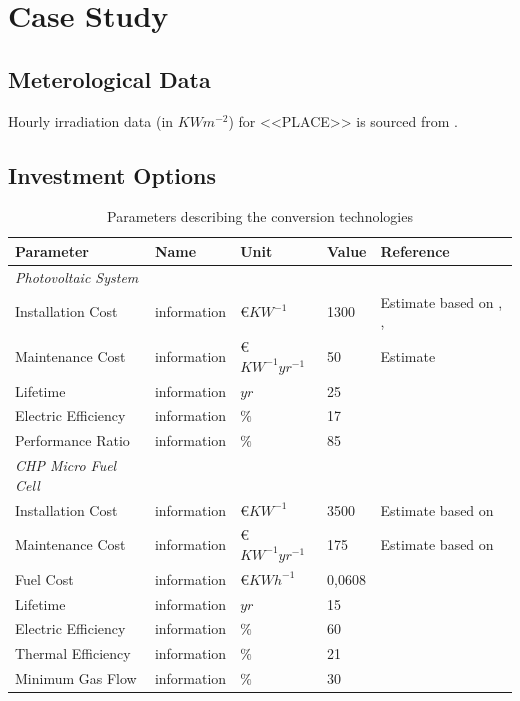 \documentclass[
	11pt,								%
	DIV10,								%
	a4paper,         					%
	oneside,							%
	headheight=20pt,					%
	footheight=20pt,					%
    parskip=full,						%
    listof=totoc,						%
	bibliography=totoc,					%
	index=totoc,						%
]{scrartcl}
\begin{document}
\newpage
\section{Case Study}
\subsection{Meterological Data}
Hourly irradiation data (in $KWm^{-2}$) for <<PLACE>> is sourced from \cite{pfenningerLongtermPatternsEuropean2016}. 
\subsection{Investment Options}
\begin{table}[H]
	\centering
	\caption{Parameters describing the conversion technologies}
	\begin{tabular}{lllll}
		\hline
		\textbf{Parameter}			& \textbf{Name}			& \textbf{Unit}			& \textbf{Value}	&\textbf{Reference}     \\ \hline
		\textit{Photovoltaic System} & & & &\\
		Installation Cost           & information     		& \euro $KW^{-1}$  		& 1300				& Estimate based on \cite{wirthAktuelleFaktenZur2018}, \cite{SolarmoduleEBay2018}, \cite{ModulePriceIndex2018}   \\
		Maintenance Cost            & information     		& \euro $KW^{-1}yr^{-1}$& 50				& Estimate \\
		Lifetime                    & information     		& $yr$  				& 25 				& \cite{wirthAktuelleFaktenZur2018}   \\
		Electric Efficiency         & information     		& $\%$  				& 17				& \cite{wirthAktuelleFaktenZur2018}   \\
		Performance Ratio           & information     		& $\%$  				& 85				& \cite{wirthAktuelleFaktenZur2018}   \\
		\textit{CHP Micro Fuel Cell} & & & &\\
		Installation Cost           & information     		& \euro $KW^{-1}$  		& 3500 				& Estimate based on \cite{LAUINGER201624}    \\
		Maintenance Cost            & information     		& \euro $KW^{-1}yr^{-1}$& 175				& Estimate based on \cite{LAUINGER201624}   \\
		Fuel	 Cost           			& information     		& \euro $KWh^{-1}$   	& 0,0608			& \cite{NaturalGasPrices2018}   \\
		Lifetime                    & information     		& $yr$  				& 15 				& \cite{LAUINGER201624}    \\
		Electric Efficiency         & information     		& $\%$  				& 60				& \cite{BlueGENWorldsMost2018}   \\
		Thermal Efficiency			& information     		& $\%$  				& 21				& \cite{BlueGENWorldsMost2018}   \\
		Minimum Gas Flow    			& information     		& $\%$ 		 			& 30				& \cite{LAUINGER201624}   \\
		\hline
	\end{tabular}
\end{table}
\end{document}
